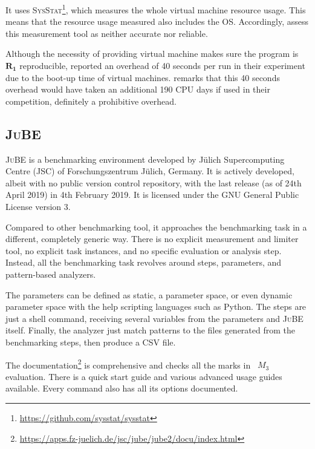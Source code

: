 It uses \textsc{SysStat}\footnote{\href{https://github.com/sysstat/sysstat}{https://github.com/sysstat/sysstat}}, which measures the whole virtual machine resource usage.
This means that the resource usage measured also includes the OS.
Accordingly, \cite{beyerReliableBenchmarkingRequirements2019} assess this measurement tool as neither accurate nor reliable.

Although the necessity of providing virtual machine makes sure the program is $\bm{R_1}$ reproducible, \citet{kordonBenchKitToolMassive2014} reported an overhead of 40 seconds per run in their experiment due to the boot-up time of virtual machines.
\cite{beyerReliableBenchmarkingRequirements2019} remarks that this 40 seconds overhead would have taken an additional 190 CPU days if used in their competition, definitely a prohibitive overhead.


\subsection{\textsc{JuBE}}

\textsc{JuBE} \citep{frings2010flexible} is a benchmarking environment developed by Jülich Supercomputing Centre (JSC) of Forschungszentrum Jülich, Germany.
It is actively developed, albeit with no public version control repository, with the last release (as of 24th April 2019) in 4th February 2019.
It is licensed under the GNU General Public License version 3.

Compared to other benchmarking tool, it approaches the benchmarking task in a different, completely generic way.
There is no explicit measurement and limiter tool, no explicit task instances, and no specific evaluation or analysis step.
Instead, all the benchmarking task revolves around steps, parameters, and pattern-based analyzers.

The parameters can be defined as static, a parameter space, or even dynamic parameter space with the help scripting languages such as Python.
The steps are just a shell command, receiving several variables from the parameters and \textsc{JuBE} itself.
Finally, the analyzer just match patterns to the files generated from the benchmarking steps, then produce a CSV file.

The documentation\footnote{\href{https://apps.fz-juelich.de/jsc/jube/jube2/docu/index.html}{https://apps.fz-juelich.de/jsc/jube/jube2/docu/index.html}} is comprehensive and checks all the marks in \firstposs~$M_3$ evaluation.
There is a quick start guide and various advanced usage guides available.
Every command also has all its options documented.

